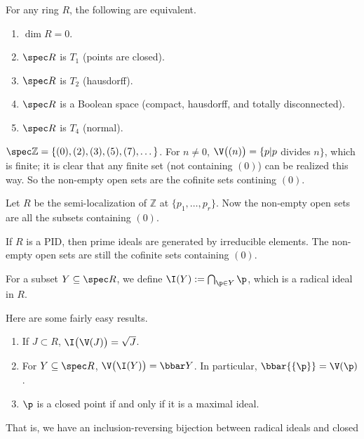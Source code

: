  \begin{proposition}
   For any ring $R$, the following are equivalent.
   \begin{enumerate}
     \item $\dim R=0$.
     \item $\spec R$ is $T_1$ (points are closed).
     \item $\spec R$ is $T_2$ (hausdorff).
     \item $\spec R$ is a Boolean space (compact, hausdorff, and totally disconnected).
     \item $\spec R$ is $T_4$ (normal).
   \end{enumerate}
 \end{proposition}
 \begin{example}
   $\spec \mathbb{Z} = \{(0),(2),(3),(5),(7),\dots\}$. For $n\neq 0$, $\V\bigl((n)\bigr) = \{p|
   p$ divides $n\}$, which is finite; it is clear that any finite set (not containing
   $(0)$) can be realized this way. So the non-empty open sets are the cofinite sets
   contining $(0)$.
 \end{example}
 \begin{example}
   Let $R$ be the semi-localization of $\mathbb{Z}$ at $\{p_1,\dots, p_r\}$. Now the non-empty
   open sets are all the subsets containing $(0)$.
 \end{example}
 \begin{example}
   If $R$ is a PID, then prime ideals are generated by irreducible elements. The
   non-empty open sets are still the cofinite sets containing $(0)$.
 \end{example}
 \begin{definition}
   For a subset $Y\subseteq \spec R$, we define $\I(Y):=\bigcap_{\p\in Y}\p$, which is a
   radical ideal in $R$.
 \end{definition}
 \begin{proposition}
   Here are some fairly easy results.
   \begin{enumerate}
     \item If $J\subset R$, $\I\bigl(\V(J)\bigr) = \sqrt J$.
     \item For $Y\subseteq \spec R$, $\V\bigl(\I(Y)\bigr)=\bbar Y$. In particular,
     $\bbar{\{\p\}}=\V(\p)$.
     \item $\p$ is a closed point if and only if it is a maximal ideal.
   \end{enumerate}
 \end{proposition}
 That is, we have an inclusion-reversing bijection between radical ideals and closed
